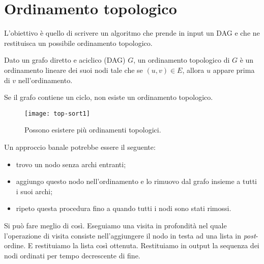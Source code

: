 \clearpage
\section{Ordinamento topologico}

L'obiettivo è quello di scrivere un algoritmo che prende in input un DAG e che ne restituisca un possibile ordinamento topologico.

\begin{definition}
Dato un grafo diretto e aciclico (DAG) \(G\), un ordinamento topologico di \(G\) è un ordinamento lineare dei suoi nodi tale che se \((u,v) \in E\), allora \(u\) appare prima di \(v\) nell'ordinamento.
\end{definition}

\begin{note}
Se il grafo contiene un ciclo, non esiste un ordinamento topologico.
\end{note}

\begin{figure}[H]
	\centering
	\texttt{[image: top-sort1]}
	\caption[Esistenza di più ordinamenti topologici]{Possono esistere più ordinamenti topologici.}
\end{figure}

Un approccio banale potrebbe essere il seguente:
\begin{itemize}
	\item trovo un nodo senza archi entranti;
	\item aggiungo questo nodo nell'ordinamento e lo rimuovo dal grafo insieme a tutti i suoi archi;
	\item ripeto questa procedura fino a quando tutti i nodi sono stati rimossi.
\end{itemize}

Si può fare meglio di così.
Eseguiamo una visita in profondità nel quale l'operazione di visita consiste nell'aggiungere il nodo in testa ad una lista in \emph{post}-ordine.
E restituiamo la lista così ottenuta.
Restituiamo in output la sequenza dei nodi ordinati per tempo decrescente di fine.

